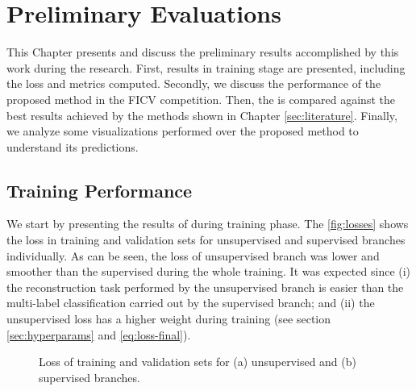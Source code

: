 \section{Preliminary Evaluations} \label{sec:results}

This Chapter presents and discuss the preliminary results accomplished by this work during the research. First, \methodname results in training stage are presented, including the loss and metrics computed. Secondly, we discuss the performance of the proposed method in the FICV competition. Then, the \methodname is compared against the best results achieved by the methods shown in Chapter \ref{sec:literature}. Finally, we analyze some visualizations performed over the proposed method to understand its predictions.

\subsection{Training Performance}

We start by presenting the results of \methodname during training phase. The \autoref{fig:losses} shows the loss in training and validation sets for unsupervised and supervised branches individually. As can be seen, the loss of unsupervised branch was lower and smoother than the supervised during the whole training. It was expected since (i) the reconstruction task performed by the unsupervised branch is easier than the multi-label classification carried out by the supervised branch; and (ii) the unsupervised loss has a higher weight during training (see section \ref{sec:hyperparams} and \autoref{eq:loss-final}).

\begin{figure}[ht]
\centering
{}
\hfill
\ContinuedFloat
{}
\caption{Loss of training and validation sets for (a) unsupervised and (b) supervised branches.}
\label{fig:losses}
\end{figure}

